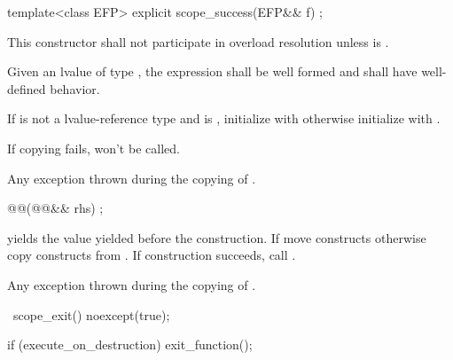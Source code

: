 \documentclass[ebook,11pt,article]{memoir}
\begin{document}
\begin{itemdecl}
template<class EFP>
explicit
scope_success(EFP&& f) ;
\end{itemdecl}

\begin{itemdescr}
\pnum
\remarks This constructor shall not participate in overload resolution unless  is .

\pnum
\requires Given an lvalue  of type , the expression  shall be well formed and shall have well-defined behavior.

\pnum
\effects If  is not a lvalue-reference type and  is , initialize   with  otherwise initialize  with . \\
\begin{note}
If copying fails,  won't be called.
\end{note}

\pnum
\throws Any exception thrown during the copying of .
\end{itemdescr}

\begin{itemdecl}
@@(@@&& rhs) ;
\end{itemdecl}

\begin{itemdescr}
\pnum
\effects %
 yields the value  yielded before the construction.
If  move constructs otherwise copy constructs  from . If construction succeeds, call .

\pnum
\throws Any exception thrown during the copying of .
\end{itemdescr}

\begin{itemdecl}
~scope_exit() noexcept(true);
\end{itemdecl}

\begin{itemdescr}
\pnum
\effects 
\begin{codeblock}
if (execute_on_destruction)
	exit_function();
\end{codeblock}
\end{itemdescr}
\end{document}

